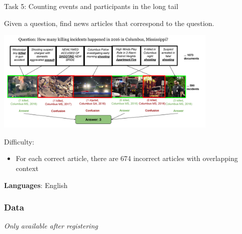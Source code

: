\documentclass[10pt, compress]{beamer}
\begin{document}



\begin{frame}{Task 5: Counting events and participants in the long tail}

Given a question, find news articles that correspond to the question.

\begin{center}
  \includegraphics[width=0.8\textwidth]{graphics/events-task5-infographic.png}
\end{center}

Difficulty:
\begin{itemize}
  \item For each correct article, there are 674 incorrect articles with overlapping context 
\end{itemize}

\textbf{Languages}: English

\end{frame}

\begin{frame}
\frametitle{Data}

\emph{Only available after registering}

\end{frame}



\end{document}
